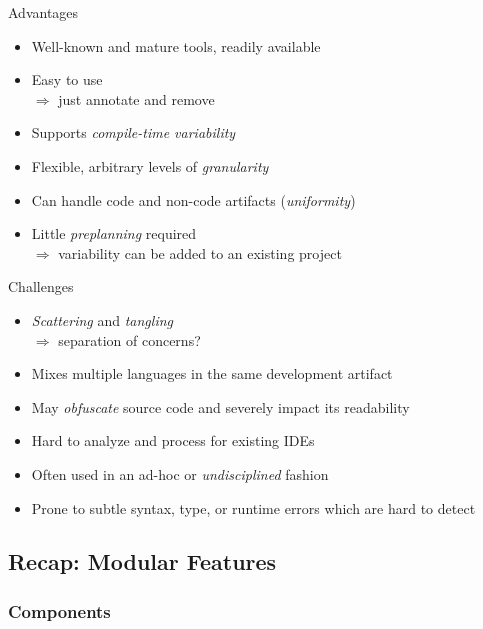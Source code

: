 \begin{frame}{\myframetitle}
	\begin{mycolumns}[animation=none]
		\begin{note}{Advantages}
			\begin{itemize}
				\item Well-known and mature tools, readily available
				\item Easy to use\\
				$\Rightarrow$ just annotate and remove
				\item Supports \emph{compile-time variability}
				\item Flexible, arbitrary levels of \emph{granularity}
				\item Can handle code and non-code artifacts (\emph{uniformity})
				\item Little \emph{preplanning} required\\
				$\Rightarrow$ variability can be added to an existing project
			\end{itemize}
		\end{note}
	\mynextcolumn
		\pause
		\begin{note}{Challenges}
			\begin{itemize}
				\item \emph{Scattering} and \emph{tangling}\\
				$\Rightarrow$ separation of concerns?
				\item Mixes multiple languages in the same development artifact
				\item May \emph{obfuscate} source code and severely impact its readability
				\item Hard to analyze and process for existing IDEs
				\item Often used in an ad-hoc or \emph{undisciplined} fashion
				\item Prone to subtle syntax, type, or runtime errors which are hard to detect
			\end{itemize}
		\end{note}
	\end{mycolumns}
\end{frame}

\subsection{Recap: Modular Features}

\subsubsection*{Components}

